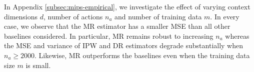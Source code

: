 In Appendix \ref{subsec:mips-empirical}, we investigate the effect of varying context dimensions $d$, number of actions $n_a$ and number of training data $m$. In every case, we observe that the MR estimator has a smaller MSE than all other baselines considered. In particular, MR remains robust to increasing $n_a$ whereas the MSE and variance of IPW and DR estimators degrade substantially when $n_a \geq 2000$. Likewise, MR outperforms the baselines even when the training data size $m$ is small.

